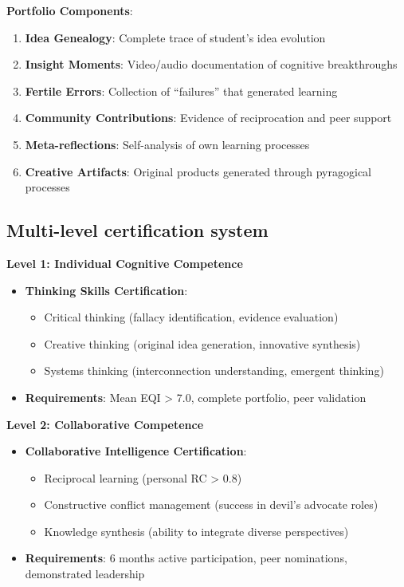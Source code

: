 \textbf{Portfolio Components}:
\begin{enumerate}
	\item \textbf{Idea Genealogy}: Complete trace of student's idea evolution
	\item \textbf{Insight Moments}: Video/audio documentation of cognitive breakthroughs
	\item \textbf{Fertile Errors}: Collection of ``failures'' that generated learning
	\item \textbf{Community Contributions}: Evidence of reciprocation and peer support
	\item \textbf{Meta-reflections}: Self-analysis of own learning processes
	\item \textbf{Creative Artifacts}: Original products generated through pyragogical processes
\end{enumerate}

\newpage

\subsection{Multi-level certification system}

\textbf{Level 1: Individual Cognitive Competence}
\begin{itemize}
	\item \textbf{Thinking Skills Certification}: 
	\begin{itemize}
		\item Critical thinking (fallacy identification, evidence evaluation)
		\item Creative thinking (original idea generation, innovative synthesis)
		\item Systems thinking (interconnection understanding, emergent thinking)
	\end{itemize}
	\item \textbf{Requirements}: Mean EQI > 7.0, complete portfolio, peer validation
\end{itemize}

\textbf{Level 2: Collaborative Competence}
\begin{itemize}
	\item \textbf{Collaborative Intelligence Certification}:
	\begin{itemize}
		\item Reciprocal learning (personal RC > 0.8)
		\item Constructive conflict management (success in devil's advocate roles)
		\item Knowledge synthesis (ability to integrate diverse perspectives)
	\end{itemize}
	\item \textbf{Requirements}: 6 months active participation, peer nominations, demonstrated leadership
\end{itemize}


